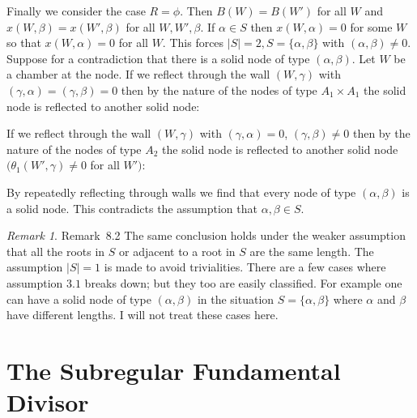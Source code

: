 \documentclass{memo-l}
\theoremstyle{definition}
\theoremstyle{remark}
\newtheorem{remark}[theorem]{Remark}
\numberwithin{section}{chapter}
\numberwithin{equation}{chapter}
\begin{document}
   Finally we consider the case $R={\phi}$.  Then $B(W) = B(W')$ for all $W$
and $x(W,{\beta})=x(W',{\beta})$ for all $W,W',{\beta}$.  If ${\alpha}
 \in  S$ then $x(W,{\alpha})=0$ for some $W$ so that $x(W,{\alpha})=0$ for
all $W$.  This forces $\vert S\vert =2, S=\{{\alpha},{\beta}\}$ with
$({\alpha},{\beta})\ne 0$.  Suppose for a contradiction that there is a
solid node of type $({\alpha},{\beta})$.  Let $W$ be a chamber at the node.
If we reflect through the wall $(W,{\gamma})$ with
$({\gamma},{\alpha})=({\gamma},{\beta})=0$ then by the nature of the nodes
of type $A_{1}\times A_{1}$ the solid node is reflected to another solid node:

\medskip
\medskip

\noindent
If we reflect through the wall $(W,{\gamma})$ with $({\gamma},{\alpha}) = 0$,
$({\gamma},{\beta})\ne 0$ then by the nature of the nodes of type $A_{2}$
the solid node is reflected to another solid node
$({\theta}_{1}(W',{\gamma})\ne 0$ for all $W')$: 

\medskip
\medskip

\noindent
By repeatedly reflecting through walls we find that every node of type
$({\alpha},{\beta})$ is a solid node.  This contradicts the assumption that
${\alpha},{\beta}  \in  S$.

{\medskip}


\begin{remark}{Remark\ 8.2}  The same conclusion holds under the weaker
assumption that all the roots in $S$ or adjacent to a root in $S$ are the
same length.  The assumption $\vert S\vert = 1$ is made to avoid
trivialities.  There are a few cases where assumption $3.1$ breaks down;
but they too are easily classified.  For example one can have a solid node
of type $({\alpha},{\beta})$ in the situation $S = \{{\alpha},{\beta}\}$
where ${\alpha}$ and ${\beta}$ have different lengths.  I will not treat
these cases here.
\end{remark}




\chapter{The Subregular Fundamental Divisor}
\end{document}
